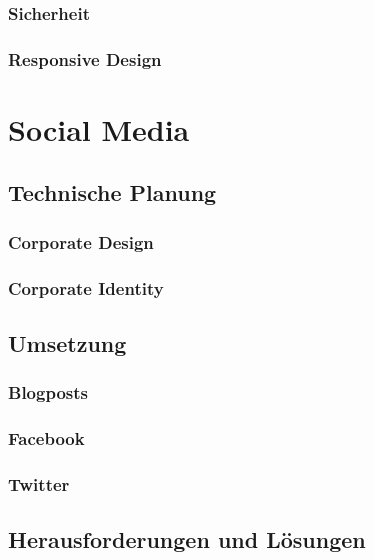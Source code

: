 {    \subsubsection{Sicherheit}

    \subsubsection{Responsive Design}

\section{Social Media}

  \subsection{Technische Planung}

    \subsubsection{Corporate Design}

    \subsubsection{Corporate Identity}

  \subsection{Umsetzung}

    \subsubsection{Blogposts}

    \subsubsection{Facebook}

    \subsubsection{Twitter}

  \subsection{Herausforderungen und Lösungen}

}
